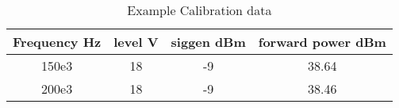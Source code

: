 \begin{table}[h!]
\centering
\begin{tabular}{||c c c c||}
 \hline
 Frequency Hz & level V & siggen dBm & forward power dBm \\ [0.5ex]
 \hline
 150e3 & 18 & -9 & 38.64 \\
 200e3 & 18 & -9 & 38.46 \\
 \hline
\end{tabular}
\caption{Example Calibration data}
\label{table:1}
\end{table}
